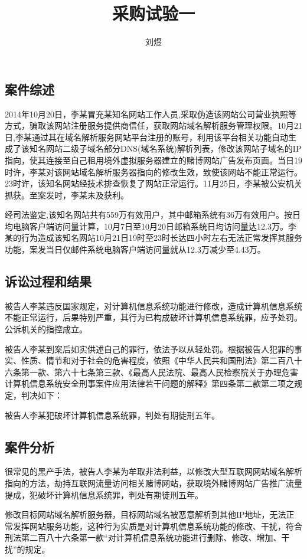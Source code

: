 \documentclass[a4paper,12pt]{article}
\title{采购试验一}
\author{刘煜}
\begin{document}
        
    \subsection{案件综述}
    

   
    2014年10月20日，李某冒充某知名网站工作人员,采取伪造该网站公司营业执照等方式，骗取该网站注册服务提供商信任，获取网站域名解析服务管理权限。10月21日,李某通过其在域名解析服务网站平台注册的账号，利用该平台相关功能自动生成了该知名网站二级子域名部分DNS(域名系统)解析列表，修改该网站子域名的IP指向，使其连接至自己租用境外虚拟服务器建立的赌博网站广告发布页面。当日19时许，李某对该网站域名解析服务器指向的修改生效，致使该网站不能正常运行。23时许，该知名网站经技术排查恢复了网站正常运行。11月25日，李某被公安机关抓获。至案发时，李某未及获利。

    经司法鉴定,该知名网站共有559万有效用户，其中邮箱系统有36万有效用户。按日均电脑客户端访问量计算，10月7日至10月20日邮箱系统日均访问量达12.3万。李某的行为造成该知名网站10月21日19时至23时长达四小时左右无法正常发挥其服务功能，案发当日仅邮件系统电脑客户端访问量就从12.3万减少至4.43万。
    
    \subsection{诉讼过程和结果}
    被告人李某违反国家规定，对计算机信息系统功能进行修改，造成计算机信息系统不能正常运行，后果特别严重，其行为已构成破坏计算机信息系统罪，应予处罚。公诉机关的指控成立。

    被告人李某到案后如实供述自己的罪行，依法予以从轻处罚。根据被告人犯罪的事实、性质、情节和对于社会的危害程度，依照《中华人民共和国刑法》第二百八十六条第一款、第六十七条第三款、《最高人民法院、最高人民检察院关于办理危害计算机信息系统安全刑事案件应用法律若干问题的解释》第四条第二款第二项之规定，判决如下：


    被告人李某犯破坏计算机信息系统罪，判处有期徒刑五年。

    \subsection{案件分析}
    很常见的黑产手法，被告人李某为牟取非法利益，以修改大型互联网网站域名解析指向的方法，劫持互联网流量访问相关赌博网站，获取境外赌博网站广告推广流量提成，犯破坏计算机信息系统罪，判处有期徒刑五年。

    修改目标网站域名解析服务器，目标网站域名被恶意解析到其他IP地址，无法正常发挥网站服务功能，这种行为实质是对计算机信息系统功能的修改、干扰，符合刑法第二百八十六条第一款“对计算机信息系统功能进行删除、修改、增加、干扰”的规定。
\end{document}
